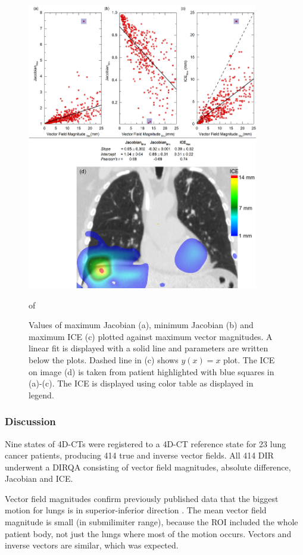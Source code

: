 \documentclass[type=dr, dr=rernat, accentcolor=tud7b,colorbacktitle, bigchapter, openright, twoside, 12pt ]{tudthesis}
\begin{document}
\begin{figure}[H]
	\begin{center}		
		\includegraphics[width=0.9\textwidth]{./Images/maxVf_lung.png}
		\caption{Values of maximum Jacobian (a), minimum Jacobian (b) and maximum ICE (c) plotted against maximum vector magnitudes. A linear fit is displayed with a solid line and parameters are written below the plots. Dashed line in (c) shows $y(x)= x$ plot.
			The ICE on image (d) is taken from patient highlighted with blue squares in (a)-(c).
			The ICE is displayed using color table as displayed in legend.}of
		\label{maxvf}
	\end{center}
\end{figure}

\newpage
\subsubsection{Discussion}
Nine states of 4D-CTs were registered to a 4D-CT reference state for 23 lung cancer patients, producing 414 true and inverse vector fields. All 414 DIR underwent a DIRQA consisting of vector field magnitudes, absolute difference, Jacobian and ICE.

Vector field magnitudes confirm previously published data that the biggest motion for lungs is in superior-inferior direction \cite{Seppenwoolde2002, Britton2007, Liu2007}. The mean vector field magnitude is small (in submilimiter range), 
because the ROI included the whole patient body, not just the lungs where most of the motion occurs. Vectors and inverse vectors are similar, which was expected.
\end{document}
